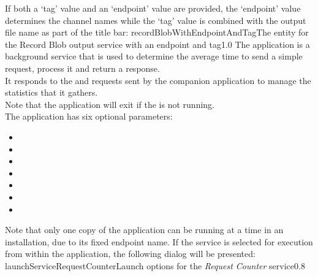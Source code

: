 If both a `tag' value and an `endpoint' value are provided, the `endpoint' value
determines the channel names while the `tag' value is combined with the output file name
as part of the title bar:
%
{recordBlobWithEndpointAndTag}{The \emph{\CMU} entity for the Record Blob output service
with an endpoint and tag}{1.0}
\condPage
{}
The  application is a background service that is
used to determine the average time to send a simple request, process it and return a
response.\\

It responds to the  and
 requests sent by the
companion application  to manage the statistics
that it gathers.\\

Note that the application will exit if the  is not
running.\\

The application has six optional parameters:
\begin{itemize}
\item{}
\item\exSp{}
\item\exSp{}
\item\exSp{}
\item\exSp{}
\item\exSp{}
\item\exSp{}
\end{itemize}
Note that only one copy of the  application can be
running at a time in an \mplusm{} installation, due to its fixed endpoint name.
\condPage
If the service is selected for execution from within the \emph{\CMU} application, the
following dialog will be presented:
%
{launchServiceRequestCounter}{Launch options for the \emph{Request Counter} service}{0.8}

